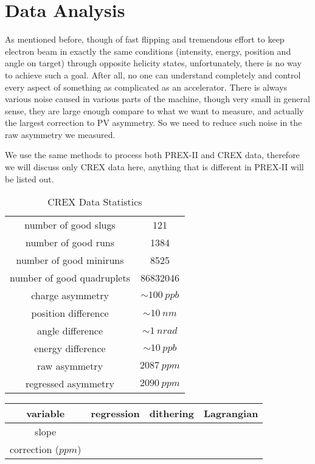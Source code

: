 \chapter{Data Analysis}
As mentioned before, though of fast flipping and tremendous effort to keep 
electron beam in exactly the same conditions (intensity, energy, position 
and angle on target) through opposite helicity states, unfortunately, 
there is no way to achieve such a goal. 
After all, no one can understand completely and control every aspect of
something as complicated as an accelerator. There is always various noise caused
in various parts of the machine, though very small in general sense, they are
large enough compare to what we want to measure, and actually the largest correction
to PV asymmetry. So we need to reduce such noise in the raw asymmetry we measured.

We use the same methods to process both PREX-II and CREX data, therefore we will
discuss only CREX data here, anything that is different in PREX-II will be listed
out.

\begin{table}
    \centering
    \begin{tabular}{c | c}
	\hline
	number of good slugs	    & 121   \\
	number of good runs	    & 1384  \\
	number of good miniruns	    & 8525  \\
	number of good quadruplets  & 86832046  \\
	\hline
	charge asymmetry    & $\sim 100\ ppb$\\
	position difference & $\sim 10\ nm$\\
	angle difference    & $\sim 1\ nrad$\\
	energy difference   & $\sim 10\ ppb$\\
	\hline	    
	raw asymmetry	    & $2087\ ppm$\\
	regressed asymmetry & $2090\ ppm$  \\
	\hline
    \end{tabular}
    \caption{CREX Data Statistics}
\end{table}

\begin{table}
    \centering
    \begin{tabular}{c | c c c}
	\hline
	variable    & regression    & dithering	    & Lagrangian    \\
	\hline
	slope	\\
	correction ($ppm$)  \\
	\hline
    \end{tabular}
\end{table}

